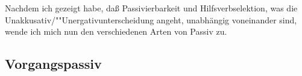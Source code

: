 Nachdem ich gezeigt habe, daß Passivierbarkeit und Hilfsverbselektion, was die
Unakkusativ/""Unergativunterscheidung angeht, unabhängig voneinander sind,
wende ich mich nun den verschiedenen Arten von Passiv zu.
%
%



\subsection{Vorgangspassiv}
\label{sec-agentive-pas}


